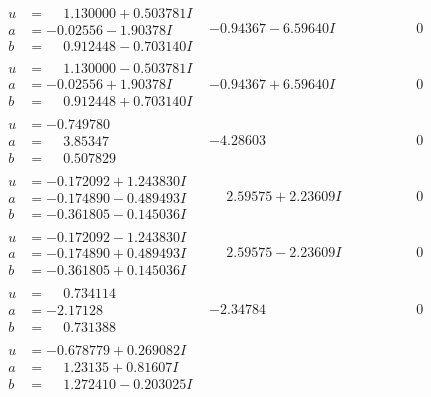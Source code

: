\documentclass[1p]{elsarticle_modified}
\theoremstyle{definition}
\begin{document}
$$\begin{array}{c|c|c}
\begin{aligned}
u &= \phantom{-}1.130000 + 0.503781 I \\
a &= -0.02556 - 1.90378 I \\
b &= \phantom{-}0.912448 - 0.703140 I\end{aligned}
 & -0.94367 - 6.59640 I & \phantom{-0.000000 } 0 \\ \hline\begin{aligned}
u &= \phantom{-}1.130000 - 0.503781 I \\
a &= -0.02556 + 1.90378 I \\
b &= \phantom{-}0.912448 + 0.703140 I\end{aligned}
 & -0.94367 + 6.59640 I & \phantom{-0.000000 } 0 \\ \hline\begin{aligned}
u &= -0.749780\phantom{ +0.000000I} \\
a &= \phantom{-}3.85347\phantom{ +0.000000I} \\
b &= \phantom{-}0.507829\phantom{ +0.000000I}\end{aligned}
 & -4.28603\phantom{ +0.000000I} & \phantom{-0.000000 } 0 \\ \hline\begin{aligned}
u &= -0.172092 + 1.243830 I \\
a &= -0.174890 - 0.489493 I \\
b &= -0.361805 - 0.145036 I\end{aligned}
 & \phantom{-}2.59575 + 2.23609 I & \phantom{-0.000000 } 0 \\ \hline\begin{aligned}
u &= -0.172092 - 1.243830 I \\
a &= -0.174890 + 0.489493 I \\
b &= -0.361805 + 0.145036 I\end{aligned}
 & \phantom{-}2.59575 - 2.23609 I & \phantom{-0.000000 } 0 \\ \hline\begin{aligned}
u &= \phantom{-}0.734114\phantom{ +0.000000I} \\
a &= -2.17128\phantom{ +0.000000I} \\
b &= \phantom{-}0.731388\phantom{ +0.000000I}\end{aligned}
 & -2.34784\phantom{ +0.000000I} & \phantom{-0.000000 } 0 \\ \hline\begin{aligned}
u &= -0.678779 + 0.269082 I \\
a &= \phantom{-}1.23135 + 0.81607 I \\
b &= \phantom{-}1.272410 - 0.203025 I\end{aligned}

\end{array}$$
\end{document}
